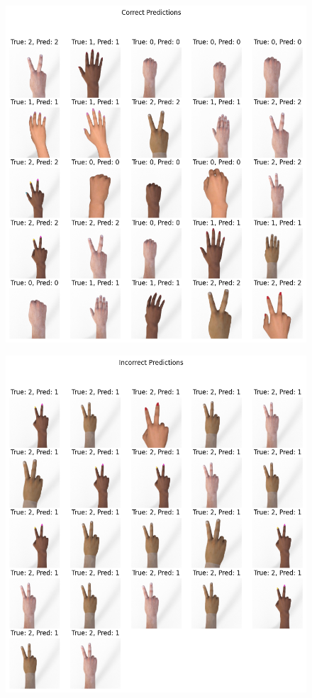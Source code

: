 \documentclass{article}
\begin{document}


\begin{figure}[h]
    \centering
    \includegraphics[scale = 0.48]{dl-figures/cnn-ex-1-correct.png}
    \label{figure:cnn-ex-1-correct}
\end{figure}

\begin{figure}[h]
    \centering
    \includegraphics[scale = 0.48]{dl-figures/cnn-ex-1-incorrect.png}
    \label{figure:cnn-ex-1-incorrect}
\end{figure}
\end{document}
